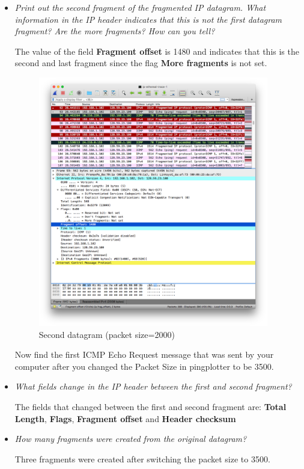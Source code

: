 \documentclass[11pt]{article}
\begin{document}
\begin{itemize}
	\item
		\textit{Print out the second fragment of the fragmented IP datagram. What information in the IP header indicates that this is not the first datagram fragment? Are the more fragments? How can you tell?}
		\par The value of the field \textbf{Fragment offset} is 1480 and indicates that this is the second and last fragment since the flag \textbf{More fragments} is not set.
		
		\begin{figure}[H]
		\centering
		\caption{Second datagram (packet size=2000)}
		\includegraphics[width=380px]{03}
		\end{figure}
		
\pagebreak

\par Now find the first ICMP Echo Request message that was sent by your computer after you changed the
Packet Size in pingplotter to be 3500.

	\item
		\textit{What fields change in the IP header between the first and second fragment?}
		\par The fields that changed between the first and second fragment are: \textbf{Total Length}, \textbf{Flags}, \textbf{Fragment offset} and \textbf{Header checksum}
		
	\item
		\textit{How many fragments were created from the original datagram?}
		\par Three fragments were created after switching the packet size to 3500.
		

\end{itemize}
\end{document}
